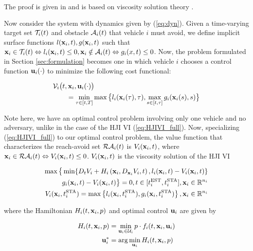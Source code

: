 \documentclass[letterpaper, 10pt, conference]{ieeeconf}      %
\begin{document}
The proof is given in \cite{fisac15} and is based on viscosity solution theory \cite{evans84, barron90}.

Now consider the system with dynamics given by (\ref{eq:dyn}). Given a time-varying target set $\mathcal{T}_i(t)$ and obstacle $\mathcal{A}_i(t)$ that vehicle $i$ must avoid, we define implicit surface functions $l(\mathbf{x}_i,t), g(\mathbf{x}_i,t)$ such that $\mathbf{x}_i\in\mathcal{T}_i(t)\Leftrightarrow l_i(\mathbf{x}_i,t)\le 0,\mathbf{x}_i\notin \mathcal{A}_i(t) \Leftrightarrow g_i(x,t)\le 0$. Now, the problem formulated in Section \ref{sec:formulation} becomes one in which vehicle $i$ chooses a control function $\mathbf{u}_i(\cdot)$ to minimize the following cost functional:

\begin{equation}
\label{eq:cost}
\begin{aligned}
&\mathcal{V}_i\big(t,\mathbf{x}_i, \mathbf{u}_i(\cdot)\big) \\
&\qquad= \min_{\tau\in[t,T]}\max\big\{l_i(\mathbf{x}_i(\tau),\tau),\max_{s\in[t,\tau]} g_i(\mathbf{x}_i(s),s)\big\}
\end{aligned}
\end{equation}

Note here, we have an optimal control problem involving only one vehicle and no adversary, unlike in the case of the HJI VI (\ref{eq:HJIVI_full}). Now, specializing (\ref{eq:HJIVI_full}) to our optimal control problem, the value function that characterizes the reach-avoid set $\mathcal{RA}_i(t)$ is $V_i(\mathbf{x}_i, t)$, where $\mathbf{x}_i \in \mathcal{RA}_i(t) \Leftrightarrow V_i(\mathbf{x}_i, t) \le 0$. $V_i(\mathbf{x}_i, t)$ is the viscosity solution \cite{crandall84} of the HJI VI

\begin{equation}
\label{eq:HJI}
\begin{aligned}
\max\big\{\min\{D_t V_i + H_i\left(\mathbf{x}_i, D_{\mathbf{x}_i} V_i,t\right),l_i(\mathbf{x}_i,t)-V_i(\mathbf{x}_i, t)\}\\
\quad g_i(\mathbf{x}_i,t)-V_i(\mathbf{x}_i,t)\big\}=0, t\in[t^{\text{EST}}_i,t^{\text{STA}}_i], \mathbf{x}_i\in\mathbb{R}^{n_i}\\
V_i(\mathbf{x}_i,t^{\text{STA}}_i) = \max\left\{l_i(\mathbf{x}_i,t^{\text{STA}}_i),g_i(\mathbf{x}_i,t^{\text{STA}}_i)\right\}, \mathbf{x}_i\in\mathbb{R}^{n_i}
\end{aligned}
\end{equation}

\noindent where the Hamiltonian $H_i(t, \mathbf{x}_i, p)$ and optimal control $\mathbf{u}_i$ are given by

\begin{equation}
\begin{aligned}
H_i(t,\mathbf{x}_i,p) &= \min_{\mathbf{u}_i\in\mathcal{U}_i} p \cdot f_i(t,\mathbf{x}_i,\mathbf{u}_i) \\
\mathbf{u}^*_i &= \arg \min_{\mathbf{u}_i} H_i(t,\mathbf{x}_i,p)
\end{aligned}
\end{equation}
\end{document}
